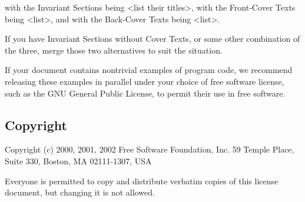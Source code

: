 {\tiny{}with the Invariant Sections being <list their titles>, with
the Front-Cover Texts being <list>, and with the Back-Cover Texts
being <list>.}{\tiny\par}

{\tiny{}If you have Invariant Sections without Cover Texts, or some
other combination of the three, merge those two alternatives to suit
the situation.}{\tiny\par}

{\tiny{}If your document contains nontrivial examples of program code,
we recommend releasing these examples in parallel under your choice
of free software license, such as the GNU General Public License,
to permit their use in free software.}{\tiny\par}

\subsection*{{\tiny{}Copyright }}

{\tiny{}Copyright (c) 2000, 2001, 2002 Free Software Foundation, Inc.
59 Temple Place, Suite 330, Boston, MA 02111-1307, USA}{\tiny\par}

{\tiny{}Everyone is permitted to copy and distribute verbatim copies
of this license document, but changing it is not allowed.}{\tiny\par}
